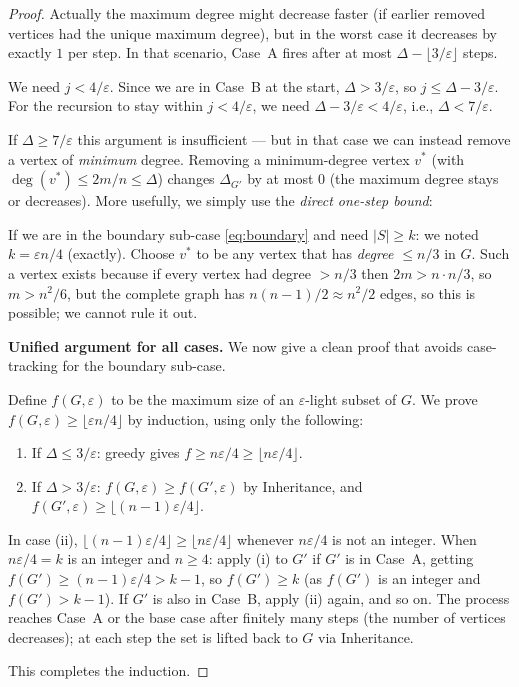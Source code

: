 \documentclass[12pt]{article}
\theoremstyle{definition}
\begin{document}
\begin{proof}
Actually the maximum degree might decrease faster (if earlier removed vertices
had the unique maximum degree), but in the worst case it decreases by exactly
$1$ per step.  In that scenario, Case~A fires after at most $\Delta-\lfloor 3/\varepsilon\rfloor$
steps.

We need $j<4/\varepsilon$.  Since we are in Case~B at the start, $\Delta>3/\varepsilon$, so
$j\le\Delta-3/\varepsilon$.  For the recursion to stay within $j<4/\varepsilon$, we need
$\Delta-3/\varepsilon < 4/\varepsilon$, i.e., $\Delta < 7/\varepsilon$.

If $\Delta\ge 7/\varepsilon$ this argument is insufficient — but in that case we can
instead remove a vertex of \emph{minimum} degree.  Removing a minimum-degree
vertex $v^*$ (with $\deg(v^*)\le 2m/n\le\Delta$) changes $\Delta_{G'}$ by at
most $0$ (the maximum degree stays or decreases).  More usefully, we simply use
the \emph{direct one-step bound}:

\medskip
If we are in the boundary sub-case \eqref{eq:boundary} and need $|S|\ge k$:
we noted $k=\varepsilon n/4$ (exactly).  Choose $v^*$ to be any vertex that has
\emph{degree $\le n/3$} in $G$.  Such a vertex exists because if every vertex
had degree $>n/3$ then $2m>n\cdot n/3$, so $m>n^2/6$, but the complete graph
has $n(n-1)/2\approx n^2/2$ edges, so this is possible; we cannot rule it out.

\medskip
\noindent\textbf{Unified argument for all cases.}
We now give a clean proof that avoids case-tracking for the boundary sub-case.

Define $f(G,\varepsilon)$ to be the maximum size of an $\varepsilon$-light subset of $G$.
We prove $f(G,\varepsilon)\ge\lfloor\varepsilon n/4\rfloor$ by induction, using only the
following:
\begin{enumerate}
  \item[(i)] If $\Delta\le 3/\varepsilon$: greedy gives $f\ge n\varepsilon/4\ge\lfloor n\varepsilon/4\rfloor$.
  \item[(ii)] If $\Delta>3/\varepsilon$: $f(G,\varepsilon)\ge f(G',\varepsilon)$ by Inheritance, and
              $f(G',\varepsilon)\ge\lfloor(n-1)\varepsilon/4\rfloor$.
\end{enumerate}
In case (ii), $\lfloor(n-1)\varepsilon/4\rfloor\ge\lfloor n\varepsilon/4\rfloor$ whenever
$n\varepsilon/4$ is not an integer.  When $n\varepsilon/4=k$ is an integer and $n\ge 4$:
apply (i) to $G'$ if $G'$ is in Case~A, getting $f(G')\ge(n-1)\varepsilon/4>k-1$,
so $f(G')\ge k$ (as $f(G')$ is an integer and $f(G')>k-1$).
If $G'$ is also in Case~B, apply (ii) again, and so on.  The process reaches
Case~A or the base case after finitely many steps (the number of vertices
decreases); at each step the set is lifted back to $G$ via Inheritance.

This completes the induction.
\end{proof}
\end{document}
